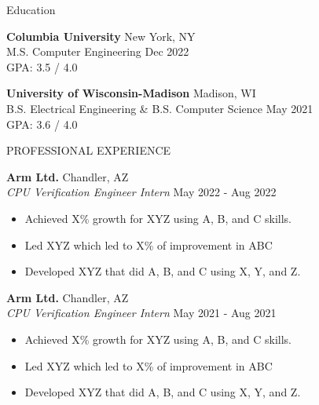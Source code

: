 \documentclass{resume} %
\begin{document}

\begin{rSection}{Education}

{\bf Columbia University} \hfill {New York, NY}\\
M.S. Computer Engineering  \hfill {Dec 2022}\\
GPA: 3.5 / 4.0

{\bf University of Wisconsin-Madison} \hfill {Madison, WI}\\
B.S. Electrical Engineering \& B.S. Computer Science  \hfill {May 2021}\\
GPA: 3.6 / 4.0

\end{rSection}


\begin{rSection}{PROFESSIONAL EXPERIENCE}

\textbf{Arm Ltd.}                           \hfill Chandler, AZ\\
\emph{CPU Verification Engineer Intern}     \hfill May 2022 - Aug 2022
\vspace*{-3mm}
\begin{itemize}

    \item Achieved X\% growth for XYZ using A, B, and C skills.
    \item Led XYZ which led to X\% of improvement in ABC
    \item Developed XYZ that did A, B, and C using X, Y, and Z. 
\end{itemize}
 
\textbf{Arm Ltd.}                           \hfill Chandler, AZ\\
\emph{CPU Verification Engineer Intern}     \hfill May 2021 - Aug 2021
\begin{itemize}
    \itemsep -0.6em 
    \item Achieved X\% growth for XYZ using A, B, and C skills.
    \item Led XYZ which led to X\% of improvement in ABC
    \item Developed XYZ that did A, B, and C using X, Y, and Z. 
\end{itemize}

\end{rSection} 
\end{document}
